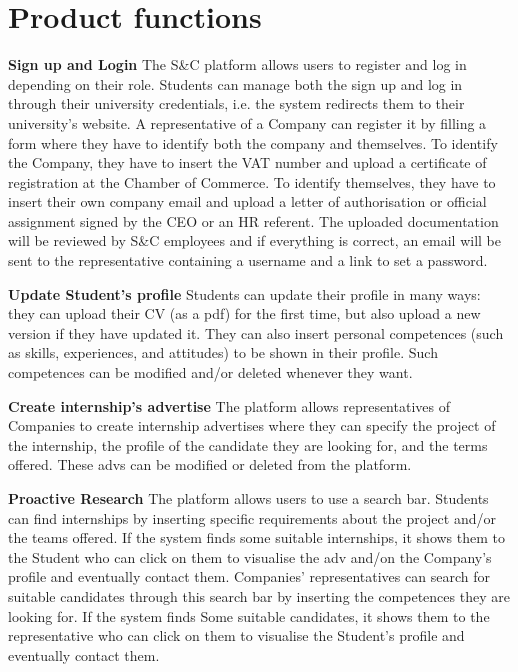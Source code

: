 \section{Product functions}
\textbf{Sign up and Login}\newline
The S\&C platform allows users to register and log in depending on their role. Students can manage both the sign up and log in through their university credentials, i.e. the system redirects them to their university's website. A representative of a Company can register it by filling a form where they have to identify both the company and themselves. To identify the Company, they have to insert the VAT number and upload a certificate of registration at the Chamber of Commerce. To identify themselves, they have to insert their own company email and upload a letter of authorisation or official assignment signed by the CEO or an HR referent. The uploaded documentation will be reviewed by S\&C employees and if everything is correct, an email will be sent to the representative containing a username and a link to set a password.

\textbf{Update Student's profile}\newline
Students can update their profile in many ways: they can upload their CV (as a pdf) for the first time, but also upload a new version if they have updated it. They can also insert personal competences (such as skills, experiences, and attitudes) to be shown in their profile. Such competences can be modified and/or deleted whenever they want.

\textbf{Create internship's advertise}\newline
The platform allows representatives of Companies to create internship advertises where they can specify the project of the internship, the profile of the candidate they are looking for, and the terms offered. These advs can be modified or deleted from the platform.

\textbf{Proactive Research}\newline
The platform allows users to use a search bar. Students can find internships by inserting specific requirements about the project and/or the teams offered. If the system finds some suitable internships, it shows them to the Student who can click on them to visualise the adv and/on the Company's profile and eventually contact them. Companies' representatives can search for suitable candidates through this search bar by inserting the competences they are looking for. If the system finds Some suitable candidates, it shows them to the representative who can click on them to visualise the Student's profile and eventually contact them. 

